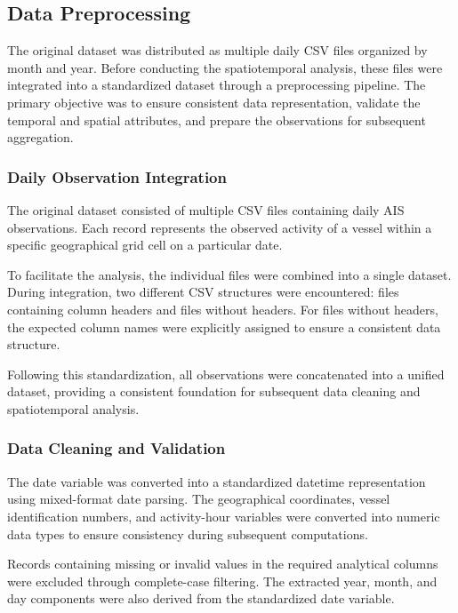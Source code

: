 \documentclass[pdflatex,sn-mathphys-num]{sn-jnl}
\theoremstyle{thmstyleone}
\theoremstyle{thmstyletwo}
\theoremstyle{thmstylethree}
\begin{document}
\subsection{Data Preprocessing}\label{subsec:preprocessing}

The original dataset was distributed as multiple daily
CSV files organized by month and year. Before conducting the
spatiotemporal analysis, these files were integrated into
a standardized dataset through a preprocessing pipeline.
The primary objective was to ensure consistent data
representation, validate the temporal and spatial
attributes, and prepare the observations for subsequent
aggregation.

\subsubsection{Daily Observation Integration}

The original dataset consisted of multiple CSV files
containing daily AIS observations. Each record represents
the observed activity of a vessel within a specific
geographical grid cell on a particular date.

To facilitate the analysis, the individual files were
combined into a single dataset. During integration,
two different CSV structures were encountered: files
containing column headers and files without headers.
For files without headers, the expected column names
were explicitly assigned to ensure a consistent
data structure.

Following this standardization, all observations
were concatenated into a unified dataset, providing
a consistent foundation for subsequent data
cleaning and spatiotemporal analysis.

\subsubsection{Data Cleaning and Validation}

The date variable was converted into a standardized
datetime representation using mixed-format date parsing.
The geographical coordinates, vessel identification
numbers, and activity-hour variables were converted
into numeric data types to ensure consistency during
subsequent computations.

Records containing missing or invalid values in the
required analytical columns were excluded through
complete-case filtering. The extracted year, month, and
day components were also derived from the standardized
date variable.
\end{document}
